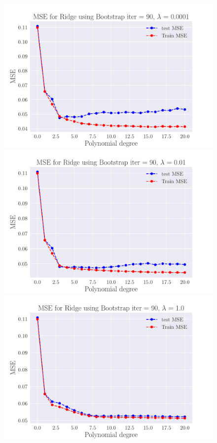\documentclass[reprint,english,notitlepage,aps,nobalancelastpage,nofootinbib]{revtex4-1}  %
\begin{document}
\begin{figure}[H]
	\includegraphics[width=\linewidth]{MSE_Ridge_n30_eps02_pol20_Bootstrap_re90_lam_0_0001.pdf}
	\endminipage\hfill
	\includegraphics[width=\linewidth]{MSE_Ridge_n30_eps02_pol20_Bootstrap_re90_lam_0_01.pdf}
	\endminipage\hfill
	\includegraphics[width=\linewidth]{MSE_Ridge_n30_eps02_pol20_Bootstrap_re90_lam_1_0.pdf}

\end{figure}
\end{document}
